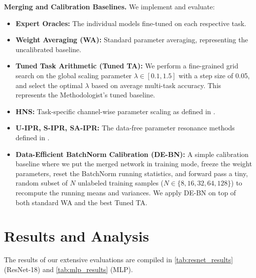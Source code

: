 \documentclass{article}
\begin{document}
\textbf{Merging and Calibration Baselines.} We implement and evaluate:
\begin{itemize}
    \item \textbf{Expert Oracles:} The individual models fine-tuned on each respective task.
    \item \textbf{Weight Averaging (WA):} Standard parameter averaging, representing the uncalibrated baseline.
    \item \textbf{Tuned Task Arithmetic (Tuned TA):} We perform a fine-grained grid search on the global scaling parameter $\lambda \in [0.1, 1.5]$ with a step size of 0.05, and select the optimal $\lambda$ based on average multi-task accuracy. This represents the Methodologist's tuned baseline.
    \item \textbf{HNS:} Task-specific channel-wise parameter scaling as defined in \cite{submission7}.
    \item \textbf{U-IPR, S-IPR, SA-IPR:} The data-free parameter resonance methods defined in \cite{submission9}.
    \item \textbf{Data-Efficient BatchNorm Calibration (DE-BN):} A simple calibration baseline where we put the merged network in training mode, freeze the weight parameters, reset the BatchNorm running statistics, and forward pass a tiny, random subset of $N$ unlabeled training samples ($N \in \{8, 16, 32, 64, 128\}$) to recompute the running means and variances. We apply DE-BN on top of both standard WA and the best Tuned TA.
\end{itemize}

\section{Results and Analysis}
\label{sec:results}

The results of our extensive evaluations are compiled in \cref{tab:resnet_results} (ResNet-18) and \cref{tab:mlp_results} (MLP).
\end{document}
